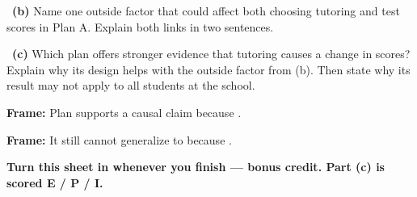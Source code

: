 \documentclass[11pt]{article}
\begin{document}
~\textbf{(b)} Name one outside factor that could affect both choosing tutoring and test scores in Plan A. Explain both links in two sentences.\par
\workspace{1.4in}

~\textbf{(c)} Which plan offers stronger evidence that tutoring causes a change in scores? Explain why its design helps with the outside factor from (b). Then state why its result may not apply to all students at the school.\par
\workspace{2.0in}

\begin{sentenceframebox}\raggedright\textbf{Frame:} Plan \blank[0.4in] supports a causal claim because \blank[2.5in].\end{sentenceframebox}

\begin{sentenceframebox}\raggedright\textbf{Frame:} It still cannot generalize to \blank[1.5in] because \blank[2.2in].\end{sentenceframebox}

\textbf{Turn this sheet in whenever you finish --- bonus credit. Part (c) is scored E / P / I.}\par
\end{document}
